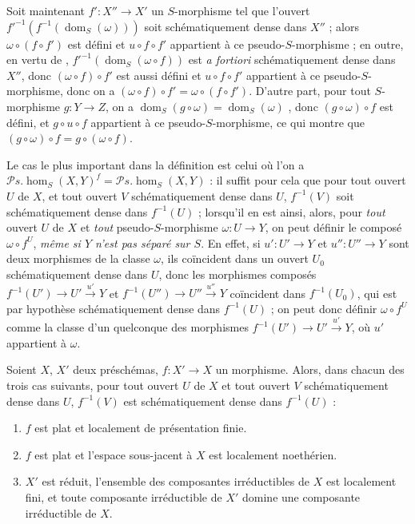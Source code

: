 \begin{env}[20.3.3]
\label{IV.20.3.3}
Soit maintenant $f':X''\to X'$ un $S$-morphisme tel que l'ouvert $f'^{-1}(f^{-1}(\operatorname{dom}_S(\omega)))$ soit schématiquement dense dans $X''$ ; alors $\omega\circ(f\circ f')$ est défini et $u\circ f\circ f'$ appartient à ce pseudo-$S$-morphisme ; en outre, en vertu de , $f'^{-1}(\operatorname{dom}_S(\omega\circ f))$ est \emph{a fortiori} schématiquement dense dans $X''$, donc $(\omega\circ f)\circ f'$ est aussi défini et $u\circ f\circ f'$ appartient à ce pseudo-$S$-morphisme, donc on a $(\omega\circ f)\circ f'=\omega\circ(f\circ f')$.
D'autre part, pour tout $S$-morphisme $g:Y\to Z$, on a $\operatorname{dom}_S(g\circ\omega)=\operatorname{dom}_S(\omega)$ , donc $(g\circ\omega)\circ f$ est défini, et $g\circ u\circ f$ appartient à ce pseudo-$S$-morphisme, ce qui montre que $(g\circ\omega)\circ f=g\circ(\omega\circ f)$.
\end{env}

\begin{env}[20.3.4]
\label{IV.20.3.4}
Le cas le plus important dans la définition  est celui où l'on a $\mathscr{P}\!s.\!\operatorname{hom}_S(X,Y)^f=\mathscr{P}\!s.\!\operatorname{hom}_S(X,Y)$ : il suffit pour cela que pour tout ouvert $U$ de $X$, et tout ouvert $V$ schématiquement dense dans $U$, $f^{-1}(V)$ soit schématiquement dense dans $f^{-1}(U)$ ; lorsqu'il en est ainsi, alors, pour \emph{tout} ouvert $U$ de $X$ et \emph{tout} pseudo-$S$-morphisme $\omega:U\to Y$, on peut définir le composé $\omega\circ f^U$, \emph{même si $Y$ n'est pas séparé sur $S$}.
En effet, si $u':U'\to Y$ et $u'':U''\to Y$ sont deux morphismes de la classe $\omega$, ils coïncident dans un ouvert $U_0$ schématiquement dense dans $U$, donc les morphismes composés $f^{-1}(U')\to U'\xrightarrow{u'}Y$ et $f^{-1}(U'')\to U''\xrightarrow{u''}Y$ coïncident dans $f^{-1}(U_0)$, qui est par hypothèse schématiquement dense dans $f^{-1}(U)$ ; on peut donc définir $\omega\circ f^U$ comme la classe d'un quelconque des morphismes $f^{-1}(U')\to U'\xrightarrow{u'}Y$, où $u'$ appartient à $\omega$.
\end{env}

\begin{proposition}[20.3.5]
Soient $X$, $X'$ deux préschémas, $f:X'\to X$ un morphisme.
Alors, dans chacun des trois cas suivants, pour tout ouvert $U$ de $X$ et tout ouvert $V$ schématiquement dense dans $U$, $f^{-1}(V)$ est schématiquement dense dans $f^{-1}(U)$ :
\begin{enumerate}[label=\emph{(\roman*)}]
  \item $f$ est plat et localement de présentation finie.
  \item $f$ est plat et l'espace sous-jacent à $X$ est localement noethérien.
  \item $X'$ est réduit, l'ensemble des composantes irréductibles de $X$ est localement fini, et toute composante irréductible de $X'$ domine une composante irréductible de $X$.
\end{enumerate}
\end{proposition}

